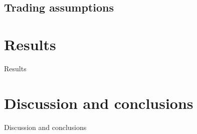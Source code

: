\documentclass[preprint,3p,twocolumn]{elsarticle}
\begin{document}
\subsection{Trading assumptions}
\label{susec:trading-assumptions}




\section{Results}
\label{sec:results}
Results

\section{Discussion and conclusions}
\label{sec:conclusions}
Discussion and conclusions



\end{document}
